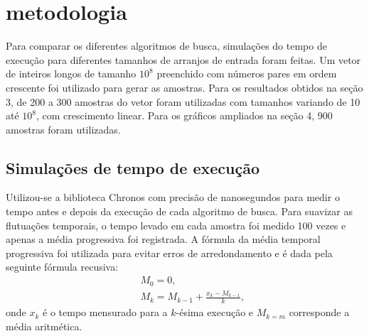 \section{metodologia}

Para comparar os diferentes algoritmos de busca, simulações do tempo de execução para diferentes tamanhos de arranjos de entrada foram feitas. Um vetor de inteiros longos de tamanho $10^8$ preenchido com números pares em ordem crescente foi utilizado para gerar as amostras. Para os resultados obtidos na seção 3, de 200 a 300 amostras do vetor foram utilizadas com tamanhos variando de 10 até $10^8$, com crescimento linear. Para os gráficos ampliados na seção 4, 900 amostras foram utilizadas. 

\subsection{Simulações de tempo de execução}

Utilizou-se a biblioteca Chronos com precisão de nanosegundos para medir o tempo antes e depois da execução de cada algoritmo de busca. Para suavizar as flutuações temporais, o tempo levado em cada amostra foi medido 100 vezes e apenas a média progressiva foi registrada. A fórmula da média temporal progressiva foi utilizada para evitar erros de arredondamento e é dada pela seguinte fórmula recusiva:
\begin{eqnarray}
&&M_0 = 0, \nonumber \\
&&M_k = M_{k-1} + \frac{x_k-M_{k-1}}{k},
\end{eqnarray}
onde $x_k$ é o tempo mensurado para a $k$-ésima execução e $M_{k=m}$ corresponde a média aritmética.


